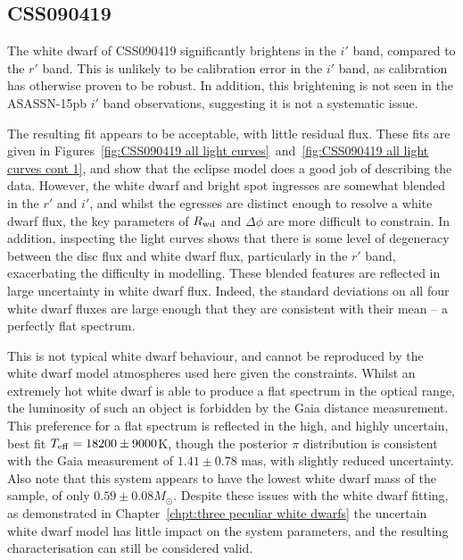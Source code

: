 \newpage
\subsection{CSS090419}

The white dwarf of CSS090419 significantly brightens in the $i'$ band, compared to the $r'$ band. This is unlikely to be calibration error in the $i'$ band, as calibration has otherwise proven to be robust. In addition, this brightening is not seen in the ASASSN-15pb $i'$ band observations, suggesting it is not a systematic issue.

The resulting fit appears to be acceptable, with little residual flux. These fits are given in Figures~\ref{fig:CSS090419 all light curves}~and~\ref{fig:CSS090419 all light curves cont 1}, and show that the eclipse model does a good job of describing the data.
However, the white dwarf and bright spot ingresses are somewhat blended in the $r'$ and $i'$, and whilst the egresses are distinct enough to resolve a white dwarf flux, the key parameters of $R_{\rm wd}$ and $\Delta \phi$ are more difficult to constrain.
In addition, inspecting the light curves shows that there is some level of degeneracy between the disc flux and white dwarf flux, particularly in the $r'$ band, exacerbating the difficulty in modelling.
These blended features are reflected in large uncertainty in white dwarf flux. Indeed, the standard deviations on all four white dwarf fluxes are large enough that they are consistent with their mean -- a perfectly flat spectrum.

This is not typical white dwarf behaviour, and cannot be reproduced by the white dwarf model atmospheres used here given the constraints. Whilst an extremely hot white dwarf is able to produce a flat spectrum in the optical range, the luminosity of such an object is forbidden by the Gaia distance measurement.
This preference for a flat spectrum is reflected in the high, and highly uncertain, best fit $T_{\rm eff} = 18200 \pm 9000$K, though the posterior $\pi$ distribution is consistent with the Gaia measurement of $1.41\pm0.78$ mas, with slightly reduced uncertainty. Also note that this system appears to have the lowest white dwarf mass of the sample, of only $0.59\pm0.08 M_\odot$.
Despite these issues with the white dwarf fitting, as demonstrated in Chapter~\ref{chpt:three peculiar white dwarfs} the uncertain white dwarf model has little impact on the system parameters, and the resulting characterisation can still be considered valid.


%     

